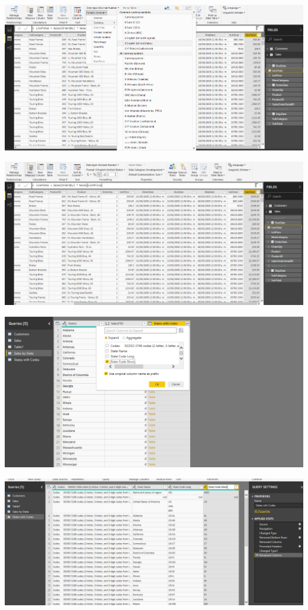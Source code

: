 	\includegraphics[width=15cm]{./Imagenes/14.png}

	\includegraphics[width=15cm]{./Imagenes/15.png}

	\includegraphics[width=15cm]{./Imagenes/16.png}

	\includegraphics[width=15cm]{./Imagenes/17.png}

